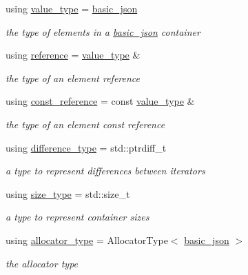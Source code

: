 \begin{DoxyCompactItemize}
using \hyperlink{classnlohmann_1_1basic__json_ac8d45b57874b4a6e9c07f7d3b5daa1f9}{value\-\_\-type} = \hyperlink{classnlohmann_1_1basic__json}{basic\-\_\-json}
\begin{DoxyCompactList}\small\item\em the type of elements in a \hyperlink{classnlohmann_1_1basic__json}{basic\-\_\-json} container \end{DoxyCompactList}\item 
using \hyperlink{classnlohmann_1_1basic__json_a3ec8e17be8732fe436e9d6733f52b7a3}{reference} = \hyperlink{classnlohmann_1_1basic__json_ac8d45b57874b4a6e9c07f7d3b5daa1f9}{value\-\_\-type} \&
\begin{DoxyCompactList}\small\item\em the type of an element reference \end{DoxyCompactList}\item 
using \hyperlink{classnlohmann_1_1basic__json_af677a29b0e66edc9f66e5167e4667071}{const\-\_\-reference} = const \hyperlink{classnlohmann_1_1basic__json_ac8d45b57874b4a6e9c07f7d3b5daa1f9}{value\-\_\-type} \&
\begin{DoxyCompactList}\small\item\em the type of an element const reference \end{DoxyCompactList}\item 
using \hyperlink{classnlohmann_1_1basic__json_aec316934a555dd1acdd3600e5d4a4cdf}{difference\-\_\-type} = std\-::ptrdiff\-\_\-t
\begin{DoxyCompactList}\small\item\em a type to represent differences between iterators \end{DoxyCompactList}\item 
using \hyperlink{classnlohmann_1_1basic__json_a1579a8f72a230358d6cd1a6e8a62859b}{size\-\_\-type} = std\-::size\-\_\-t
\begin{DoxyCompactList}\small\item\em a type to represent container sizes \end{DoxyCompactList}\item 
using \hyperlink{classnlohmann_1_1basic__json_aa44ce84b9ac506b905b8fb56c9a0989d}{allocator\-\_\-type} = Allocator\-Type$<$ \hyperlink{classnlohmann_1_1basic__json}{basic\-\_\-json} $>$
\begin{DoxyCompactList}\small\item\em the allocator type \end{DoxyCompactList}\item 

\end{DoxyCompactItemize}

